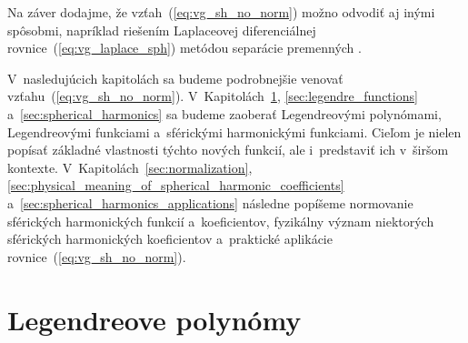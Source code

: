 \documentclass[a4paper, 12pt]{book}
\begin{document}
Na záver dodajme, že vzťah~(\ref{eq:vg_sh_no_norm}) možno odvodiť aj inými 
spôsobmi, napríklad riešením Laplaceovej diferenciálnej 
rovnice~(\ref{eq:vg_laplace_sph}) metódou separácie premenných 
\parencite{MoritzPhysicalGeodesy,Janak2006}.

V~nasledujúcich kapitolách sa budeme podrobnejšie venovať 
vzťahu~(\ref{eq:vg_sh_no_norm}).  V~Kapitolách~\ref{sec:legendre_polynomials}, 
\ref{sec:legendre_functions} a~\ref{sec:spherical_harmonics} sa budeme zaoberať 
Legendreovými polynómami, Legendreovými funkciami a~sférickými harmonickými 
funkciami.  Cieľom je nielen popísať základné vlastnosti týchto nových funkcií, 
ale i~predstaviť ich v~širšom kontexte.  V~Kapitolách~\ref{sec:normalization}, 
\ref{sec:physical_meaning_of_spherical_harmonic_coefficients} 
a~\ref{sec:spherical_harmonics_applications} následne popíšeme normovanie 
sférických harmonických funkcií a~koeficientov, fyzikálny význam niektorých 
sférických harmonických koeficientov a~praktické aplikácie 
rovnice~(\ref{eq:vg_sh_no_norm}).






\section{Legendreove polynómy}
\label{sec:legendre_polynomials}
\end{document}
